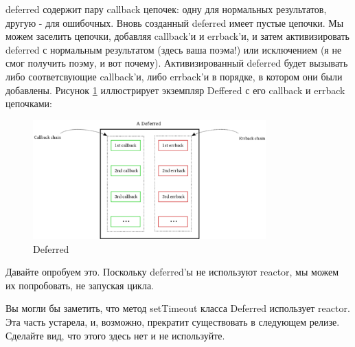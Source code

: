 deferred содержит пару callback цепочек: одну для нормальных 
результатов, другую - для ошибочных. Вновь созданный deferred 
имеет пустые цепочки. Мы можем заселить цепочки, добавляя callback'и и 
errback'и, и затем активизировать deferred с нормальным результатом (здесь ваша поэма!) 
или исключением (я не смог получить поэму, и вот почему). Активизированный  
deferred будет вызывать либо соответсвующие callback'и, либо 
errback'и в порядке, в котором они были добавлены. Рисунок \ref{fig:deferred-1} 
иллюстрирует экземпляр Deffered с его callback и errback цепочками:

\begin{figure}[h]
\begin{center}
    \includegraphics[width=0.8\textwidth]{images/deferred-1.pdf}
    \caption{Deferred\label{fig:deferred-1}}
\end{center}
\end{figure}

\eject

Давайте опробуем это. Поскольку deferred'ы не используют 
reactor, мы можем их попробовать, не запуская цикла.


Вы могли бы заметить, что метод setTimeout класса Deferred 
использует reactor. Эта часть устарела, и, возможно, прекратит существовать 
в следующем релизе. Сделайте вид, что этого здесь нет и не 
используйте.


